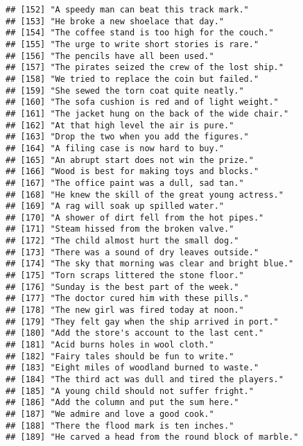\documentclass[
]{article}
\begin{document}
\begin{verbatim}
## [152] "A speedy man can beat this track mark."                   
## [153] "He broke a new shoelace that day."                        
## [154] "The coffee stand is too high for the couch."              
## [155] "The urge to write short stories is rare."                 
## [156] "The pencils have all been used."                          
## [157] "The pirates seized the crew of the lost ship."            
## [158] "We tried to replace the coin but failed."                 
## [159] "She sewed the torn coat quite neatly."                    
## [160] "The sofa cushion is red and of light weight."             
## [161] "The jacket hung on the back of the wide chair."           
## [162] "At that high level the air is pure."                      
## [163] "Drop the two when you add the figures."                   
## [164] "A filing case is now hard to buy."                        
## [165] "An abrupt start does not win the prize."                  
## [166] "Wood is best for making toys and blocks."                 
## [167] "The office paint was a dull, sad tan."                    
## [168] "He knew the skill of the great young actress."            
## [169] "A rag will soak up spilled water."                        
## [170] "A shower of dirt fell from the hot pipes."                
## [171] "Steam hissed from the broken valve."                      
## [172] "The child almost hurt the small dog."                     
## [173] "There was a sound of dry leaves outside."                 
## [174] "The sky that morning was clear and bright blue."          
## [175] "Torn scraps littered the stone floor."                    
## [176] "Sunday is the best part of the week."                     
## [177] "The doctor cured him with these pills."                   
## [178] "The new girl was fired today at noon."                    
## [179] "They felt gay when the ship arrived in port."             
## [180] "Add the store's account to the last cent."                
## [181] "Acid burns holes in wool cloth."                          
## [182] "Fairy tales should be fun to write."                      
## [183] "Eight miles of woodland burned to waste."                 
## [184] "The third act was dull and tired the players."            
## [185] "A young child should not suffer fright."                  
## [186] "Add the column and put the sum here."                     
## [187] "We admire and love a good cook."                          
## [188] "There the flood mark is ten inches."                      
## [189] "He carved a head from the round block of marble."         

\end{verbatim}
\end{document}
